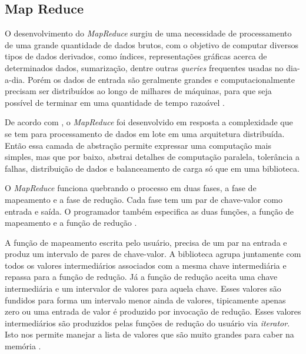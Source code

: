         \subsection{Map Reduce}

            O desenvolvimento do \textit{MapReduce} surgiu de uma necessidade de processamento de uma grande
            quantidade de dados brutos, com o objetivo  de computar diversos tipos de dados derivados, como índices,
            representações gráficas acerca de determinados dados, sumarização, dentre outras \textit{queries} frequentes
            usadas no dia-a-dia. Porém os dados de entrada são geralmente grandes e computacionalmente precisam ser
            distribuídos ao longo de milhares de máquinas, para que seja possível de terminar em uma quantidade de
            tempo razoável \cite{dean2008}.

            De acordo com , o \textit{MapReduce} foi desenvolvido em resposta a complexidade
            que se tem para processamento de dados em lote em uma arquitetura distribuída. Então essa camada de
            abstração permite expressar uma computação mais simples, mas que por baixo, abstrai detalhes de computação
            paralela, tolerância a falhas, distribuição de dados e balanceamento de carga só que em uma biblioteca.

            O \textit{MapReduce} funciona quebrando o processo em duas fases, a fase de mapeamento e a fase de
            redução. Cada fase tem um par de chave-valor como entrada e saída. O programador também especifica
            as duas funções, a função de mapeamento e a função de redução \cite{white2015}.

            A função de mapeamento escrita pelo usuário, precisa de um par na entrada e produz um intervalo de pares
            de chave-valor. A biblioteca agrupa juntamente com todos os valores intermediários associados com a
            mesma chave intermediária e repassa para a função de redução. Já a função de redução aceita uma
            chave intermediária e um intervalor de valores para aquela chave. Esses valores são fundidos para
            forma um intervalo menor ainda de valores, tipicamente apenas zero ou uma entrada de valor é produzido
            por invocação de redução. Esses valores intermediários são produzidos pelas funções de redução do
            usuário via \textit{iterator}. Isto nos permite manejar a lista de valores que são muito grandes para
            caber na memória \cite{dean2008}.

